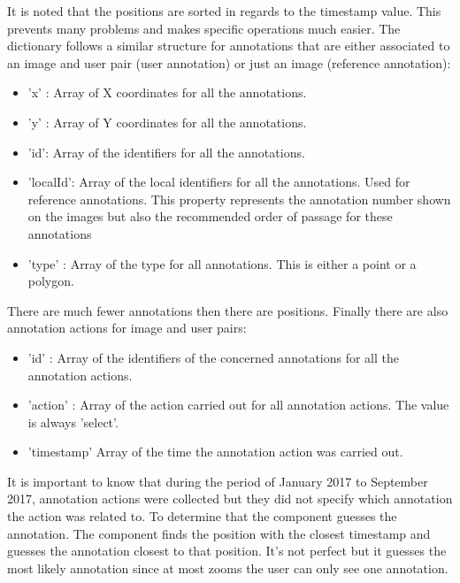 \documentclass[a4paper,11pt]{report}
\numberwithin{figure}{section} %
\begin{document}
    It is noted that the positions are sorted in regards to the timestamp value.
    This prevents many problems and makes specific operations much easier.
    The dictionary follows a similar structure for annotations that are either associated to an image and user pair (user annotation) or just an image (reference annotation):
    \begin{itemize}
        \item[\textbullet] 'x' : Array of X coordinates for all the annotations.
        \item[\textbullet] 'y' : Array of Y coordinates for all the annotations.
        \item[\textbullet] 'id': Array of the identifiers for all the annotations.
        \item[\textbullet] 'localId': Array of the local identifiers for all the annotations.
        Used for reference annotations.
        This property represents the annotation number shown on the images but also the recommended order of passage for these annotations
        \item[\textbullet] 'type' : Array of the type for all annotations.
        This is either a point or a polygon.
    \end{itemize}

    There are much fewer annotations then there are positions.
    Finally there are also annotation actions for image and user pairs:
    \begin{itemize}
        \item[\textbullet] 'id' : Array of the identifiers of the concerned annotations for all the annotation actions.
        \item[\textbullet] 'action' : Array of the action carried out for all annotation actions.
        The value is always 'select'.
        \item[\textbullet] 'timestamp' Array of the time the annotation action was carried out.
    \end{itemize}
    It is important to know that during the period of January 2017 to September 2017, annotation actions were collected but they did not specify which annotation the action was related to.
    To determine that the component guesses the annotation.
    The component finds the position with the closest timestamp and guesses the annotation closest to that position.
    It's not perfect but it guesses the most likely annotation since at most zooms the user can only see one annotation.\\
\end{document}
